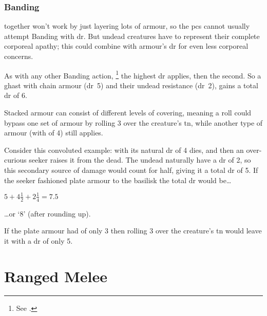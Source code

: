 \begin{multicols}{2}
\subsubsection{Banding }
\label{bandingArmour}
together won't work by just layering lots of armour, so the \glspl{pc} cannot usually attempt Banding with \gls{dr}.
But undead creatures have  to represent their complete corporeal apathy; this could combine with armour's \gls{dr} for even less corporeal concerns.

As with any other Banding action,%
\footnote{See .}
the highest \gls{dr} applies, then the second.
So a ghast with chain armour (\gls{dr}~5) and their undead resistance (\gls{dr}~2), gains a total \gls{dr} of 6.

Stacked armour can consist of different levels of \gls{covering}, meaning a roll could bypass one set of armour by rolling 3 over the creature's \gls{tn}, while another type of armour (with  of 4) still applies.

Consider this convoluted example:  with its natural \gls{dr} of 4 dies, and then an over-curious \gls{seeker} raises it from the dead.
The undead naturally have a \gls{dr} of 2, so this secondary source of damage would count for half, giving it a total \gls{dr} of 5.
If the \gls{seeker} fashioned plate armour to the \gls{basilisk} the total \gls{dr} would be\ldots

\begin{center}
{
  \LARGE $5 + $\Large$4\frac{1}{2} + $\normalsize$2\frac{1}{4} =  7.5$
}
\end{center}

\ldots or `8' (after rounding up).

If the plate armour had  of only 3 then rolling 3 over the creature's \gls{tn} would leave it with a \gls{dr} of only 5.

\end{multicols}

\section{Ranged Melee}

